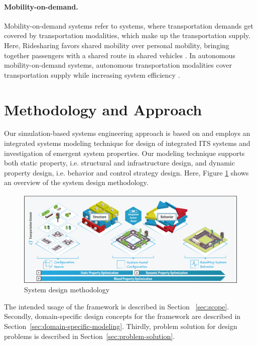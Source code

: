 \documentclass[a4paper,twoside]{article}
\begin{document}
	\paragraph{Mobility-on-demand.}
\label{sec:mobility-on-demand-systems}
	Mobility-on-demand systems refer to systems, where transportation demands get covered by transportation modalities, which make up the transportation supply.
	Here, Ridesharing favors shared mobility over personal mobility, bringing together passengers with a shared route in shared vehicles \cite{furuhata2013ridesharing}.
	 In autonomous mobility-on-demand systems, autonomous transportation modalities cover transportation supply while increasing system efficiency \cite{fagnant2014travel}. 
	
	\section{Methodology and Approach}
	\label{sec:approach}
	
	Our simulation-based systems engineering approach is based on \cite{ascher_hackenberg_2015,ascher_hackenberg_2016,ascher_hackenberg_2017,ascher_hackenberg_albayrak_2023,ascher2023discrete}
	and employs an integrated systems modeling technique for design of integrated ITS systems and investigation of emergent system properties. Our modeling technique supports both static property, i.e. structural and infrastructure design, and dynamic property design, i.e. behavior and control strategy design. Here, Figure \ref{fig:concept} shows an overview of the system design methodology.
	
	\begin{figure}[!ht]
		\centering
		\includegraphics[width=0.95\columnwidth]{property_optimization.png}
		\caption{System design methodology}
		\label{fig:concept}
	\end{figure}
	
	
	The intended usage of the framework is described in Section ~\ref{sec:scope}.
	Secondly, domain-specific design concepts for the framework are described in Section~\ref{sec:domain-specific-modeling}.
	Thirdly, problem solution for design problems is described in Section~\ref{sec:problem-solution}.
	
\end{document}
